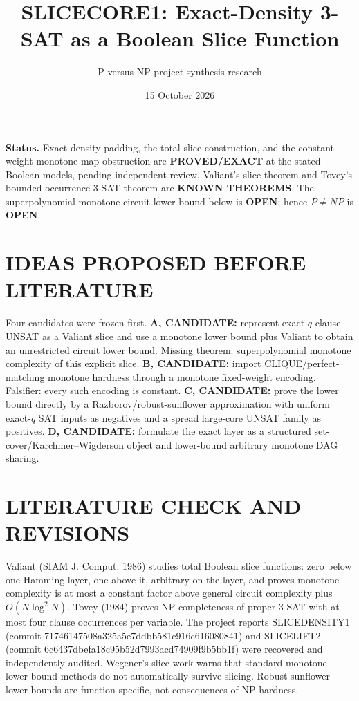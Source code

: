 \documentclass[11pt]{article}
\title{SLICECORE1: Exact-Density 3-SAT as a Boolean Slice Function}
\author{P versus NP project synthesis research}
\date{15 October 2026}
\begin{document}
\maketitle
\noindent\textbf{Status.} Exact-density padding, the total slice construction, and the constant-weight monotone-map obstruction are \textbf{PROVED/EXACT} at the stated Boolean models, pending independent review. Valiant's slice theorem and Tovey's bounded-occurrence 3-SAT theorem are \textbf{KNOWN THEOREMS}. The superpolynomial monotone-circuit lower bound below is \textbf{OPEN}; hence $P\ne NP$ is \textbf{OPEN}.

\section{IDEAS PROPOSED BEFORE LITERATURE}
Four candidates were frozen first. \textbf{A, CANDIDATE:} represent exact-$q$-clause UNSAT as a Valiant slice and use a monotone lower bound plus Valiant to obtain an unrestricted circuit lower bound. Missing theorem: superpolynomial monotone complexity of this explicit slice. \textbf{B, CANDIDATE:} import CLIQUE/perfect-matching monotone hardness through a monotone fixed-weight encoding. Falsifier: every such encoding is constant. \textbf{C, CANDIDATE:} prove the lower bound directly by a Razborov/robust-sunflower approximation with uniform exact-$q$ SAT inputs as negatives and a spread large-core UNSAT family as positives. \textbf{D, CANDIDATE:} formulate the exact layer as a structured set-cover/Karchmer--Wigderson object and lower-bound arbitrary monotone DAG sharing.

\section{LITERATURE CHECK AND REVISIONS}
Valiant (SIAM J. Comput. 1986) studies total Boolean slice functions: zero below one Hamming layer, one above it, arbitrary on the layer, and proves monotone complexity is at most a constant factor above general circuit complexity plus $O(N\log^2N)$. Tovey (1984) proves NP-completeness of proper 3-SAT with at most four clause occurrences per variable. The project reports SLICEDENSITY1 (commit 71746147508a325a5e7ddbb581c916c616080841) and SLICELIFT2 (commit 6c6437dbefa18c95b52d7993acd74909f9b5bb1f) were recovered and independently audited. Wegener's slice work warns that standard monotone lower-bound methods do not automatically survive slicing. Robust-sunflower lower bounds are function-specific, not consequences of NP-hardness.
\end{document}
